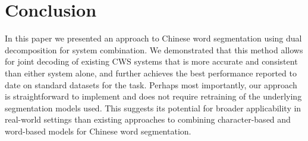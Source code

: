 \section{Conclusion}

In this paper we presented an approach to Chinese word segmentation using dual decomposition for system combination. We demonstrated that this method allows for joint decoding of existing CWS systems that is more accurate and consistent than either system alone, and further achieves the best performance reported to date on standard datasets for the task.
Perhaps most importantly, our approach is straightforward to implement and does not require retraining of the underlying segmentation models used. This suggests its potential for broader applicability in real-world settings than existing approaches to combining character-based and word-based models for Chinese word segmentation.